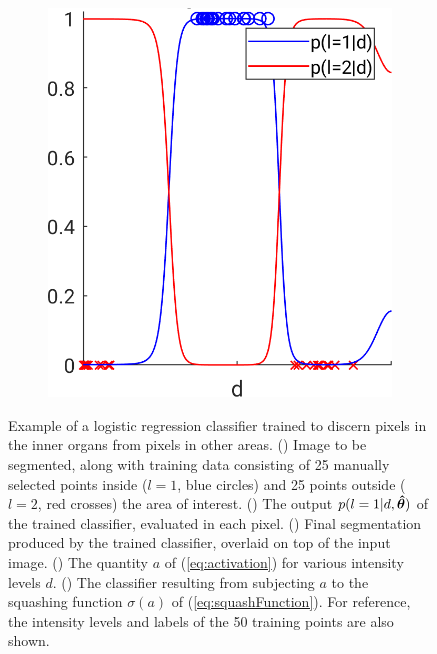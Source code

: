 \documentclass[10pt,twoside]{book}
\begin{document}
\begin{figure}
\begin{subfigure}{0.35\textwidth}
    \caption{}
    \label{fig:logisticRegressionImageClassification_d}
  \end{subfigure}
  \begin{subfigure}{0.35\textwidth}
    \centering
    \includegraphics[width=\textwidth]{scenario1_training_posteriors}
    \caption{}
    \label{fig:logisticRegressionImageClassification_e}
  \end{subfigure}
  \caption{Example of a logistic regression classifier trained to discern pixels in the inner organs from pixels in other areas.
  () Image to be segmented, along with training data consisting of 25 manually selected points inside ($l=1$, blue circles) and 25 points outside ($l=2$, red crosses) the area of interest. 
  () The output $p( l=1 | d, {\mbox{\boldmath {${\hat{\theta}}$}}} )$ of the trained classifier, evaluated in each pixel.
  () Final segmentation produced by the trained classifier, overlaid on top of the input image.
  () The quantity $a$ of (\eqref{eq:activation}) for various intensity levels $d$.
  () The classifier resulting from subjecting $a$ to the squashing function $\sigma(a)$ of (\eqref{eq:squashFunction}). For reference, the intensity levels and labels of the 50 training points are also shown.
  }
  \label{fig:logisticRegressionImageClassification}
\end{figure}
\end{document}
